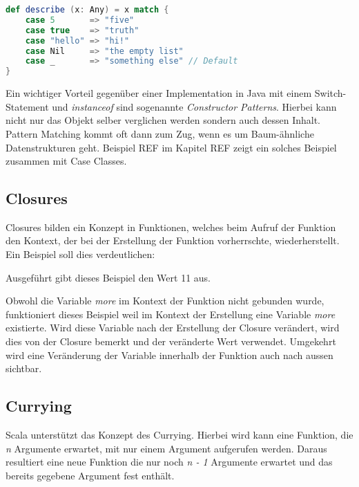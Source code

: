 \begin{lstlisting}[float=ht,language=scala,caption=Pattern Matching auf Litale \cite{odersky},label=lst:patternMatching]
def describe (x: Any) = x match {
	case 5       => "five"
	case true    => "truth"
	case "hello" => "hi!"
	case Nil     => "the empty list"
	case _       => "something else" // Default
}
\end{lstlisting}

Ein wichtiger Vorteil gegenüber einer Implementation in Java mit
einem Switch-Statement und \emph{instanceof} sind sogenannte 
\emph{Constructor Patterns}. Hierbei kann nicht nur das Objekt selber
verglichen werden sondern auch dessen Inhalt. \\

Pattern Matching kommt oft dann zum Zug, wenn es um Baum-ähnliche
Datenstrukturen geht. Beispiel REF im Kapitel REF zeigt ein solches
Beispiel zusammen mit Case Classes.

\subsection{Closures}

Closures bilden ein Konzept in Funktionen, welches beim Aufruf der 
Funktion den Kontext, der bei der Erstellung der Funktion vorherrschte,
wiederherstellt. \\

Ein Beispiel soll dies verdeutlichen:



Ausgeführt gibt dieses Beispiel den Wert 11 aus.

Obwohl die Variable \emph{more} im Kontext der Funktion nicht gebunden
wurde, funktioniert dieses Beispiel weil im Kontext der Erstellung eine
Variable \emph{more} existierte. Wird diese Variable nach der
Erstellung der Closure verändert, wird dies von der Closure bemerkt und 
der veränderte Wert verwendet. Umgekehrt wird eine Veränderung der
Variable innerhalb der Funktion auch nach aussen sichtbar.

\subsection{Currying}

Scala unterstützt das Konzept des Currying. Hierbei wird kann eine Funktion,
die \emph{n} Argumente erwartet, mit nur einem Argument aufgerufen werden. 
Daraus resultiert eine neue Funktion die nur noch \emph{n - 1} Argumente
erwartet und das bereits gegebene Argument fest enthält.\\

